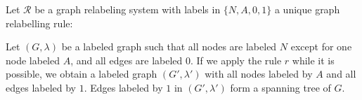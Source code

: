 \documentclass{book}
\begin{document}
\begin{example}
  \label{example:gls_spinning_tree}
  Let \(\mathcal{R}\) be a graph relabeling system with labels in \( \{N, A, 0, 1\}\) a unique graph relabelling rule:

  \begin{center}
  \end{center}

  Let \( (G, \lambda) \) be a labeled graph such that all nodes are labeled \(N\) except for one node labeled \(A\), and all edges are labeled \(0\). 
  If we apply the rule \(r\) while it is possible, we obtain a labeled graph \( (G', \lambda') \) with all nodes labeled by \(A\) and all edges labeled by \(1\). Edges labeled by \(1\) in \( (G', \lambda') \) form a spanning tree of \( G \). 
  
\end{example}
\end{document}
